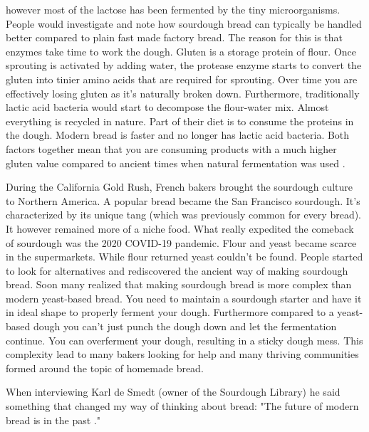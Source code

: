 however most of the lactose has been fermented by
the tiny microorganisms. People would investigate and
note how sourdough bread can typically be handled better
compared to plain fast made factory bread. The
reason for this is that enzymes take time to work the dough.
Gluten is a storage protein of flour. Once
sprouting is activated by adding water, the protease
enzyme starts to convert the gluten into tinier amino acids
that are required for sprouting. Over time you are effectively
losing gluten as it's naturally broken down. Furthermore,
traditionally lactic acid bacteria would start to decompose
the flour-water mix. Almost everything is recycled in nature.
Part of their diet is to consume the proteins in the dough.
Modern bread is faster and no longer has lactic acid bacteria.
Both factors together mean that you are consuming products
with a much higher gluten value compared to ancient times
when natural fermentation was used \cite{raffaella+di+cagno}.

During the California Gold Rush, French bakers brought the sourdough
culture to Northern America. A popular bread became the
San Francisco sourdough. It's characterized by its unique
tang (which was previously common for every bread). It
however remained more of a niche food. What really expedited
the comeback of sourdough was the 2020 COVID-19 pandemic.
Flour and yeast became scarce in the supermarkets. While
flour returned yeast couldn't be found. People started
to look for alternatives and rediscovered the ancient
way of making sourdough bread. Soon many realized
that making sourdough bread is more complex than modern
yeast-based bread. You need to maintain a sourdough starter
and have it in ideal shape to properly ferment your dough.
Furthermore compared to a yeast-based dough you can't just
punch the dough down and let the fermentation continue.
You can overferment your dough, resulting in a sticky
dough mess. This complexity lead to many bakers looking
for help and many thriving communities formed around
the topic of homemade bread.

When interviewing Karl de Smedt (owner of the Sourdough
Library) he said something that changed my way of thinking
about bread: "The future of
modern bread is in the past \cite{interview+karl+de+smedt}."
